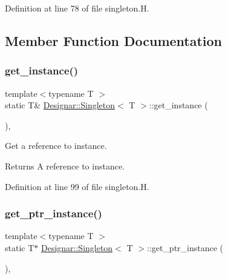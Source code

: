 Definition at line 78 of file singleton.\+H.



\subsection{Member Function Documentation}
\mbox{\label{class_designar_1_1_singleton_a747ab94efeaa0d985c194c2f91616075}} 
\subsubsection{\texorpdfstring{get\+\_\+instance()}{get\_instance()}}
{\footnotesize\ttfamily template$<$typename T $>$ \\
static T\& \hyperlink{class_designar_1_1_singleton}{Designar\+::\+Singleton}$<$ T $>$\+::get\+\_\+instance (\begin{DoxyParamCaption}{ }\end{DoxyParamCaption})\hspace{0.3cm}{\ttfamily [inline]}, {\ttfamily [static]}}

Get a reference to instance.

\begin{DoxyReturn}{Returns}
A reference to instance. 
\end{DoxyReturn}


Definition at line 99 of file singleton.\+H.

\mbox{\label{class_designar_1_1_singleton_a4246f5f346bda552c3f0b317792d2fe5}} 
\subsubsection{\texorpdfstring{get\+\_\+ptr\+\_\+instance()}{get\_ptr\_instance()}}
{\footnotesize\ttfamily template$<$typename T $>$ \\
static T$\ast$ \hyperlink{class_designar_1_1_singleton}{Designar\+::\+Singleton}$<$ T $>$\+::get\+\_\+ptr\+\_\+instance (\begin{DoxyParamCaption}{ }\end{DoxyParamCaption})\hspace{0.3cm}{\ttfamily [inline]}, {\ttfamily [static]}}

